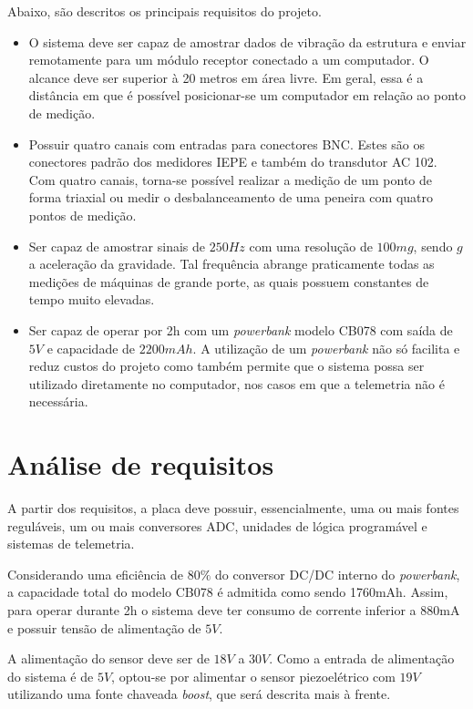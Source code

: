 \documentclass[
	12pt,				%
	openright,			%
	twoside,			%
	a4paper,			%
	english,			%
	french,				%
	spanish,			%
	brazil,				%
	]{abntex2}
\begin{document}
		Abaixo, são descritos os principais requisitos do projeto.

		\begin{itemize}
			\item O sistema deve ser capaz de amostrar dados de vibração da
			estrutura e enviar remotamente para um módulo receptor conectado a um computador. O alcance
			deve ser superior à 20 metros em área livre. Em geral, essa é a distância em que é possível posicionar-se um computador em relação ao ponto de medição.
			
			\item Possuir quatro canais com entradas para conectores BNC. Estes são os conectores padrão dos medidores IEPE e também do transdutor AC 102. Com quatro canais, torna-se possível realizar a medição de um ponto de forma triaxial ou medir o desbalanceamento de uma peneira com quatro pontos de medição.
			
			\item Ser capaz de amostrar sinais de $250Hz$ com uma resolução de $100mg$, sendo $g$
			a aceleração da gravidade. Tal frequência abrange praticamente todas as medições de máquinas de grande porte, as quais possuem constantes de tempo muito elevadas.
			
			\item Ser capaz de operar por 2h com um \textit{powerbank} modelo CB078 com saída de $5V$
			e capacidade de $2200mAh$. A utilização de um \textit{powerbank} não só facilita e reduz custos do projeto como também permite que o sistema possa ser utilizado diretamente no computador, nos casos em que a telemetria não é necessária.
			
		\end{itemize}

	\section{Análise de requisitos}
	
		A partir dos requisitos, a placa deve possuir, essencialmente, uma
		ou mais fontes reguláveis, um ou mais conversores ADC, unidades de lógica programável
		e sistemas de telemetria.

		Considerando uma eficiência de $80\%$ do conversor DC/DC interno do
		\textit{powerbank}, a capacidade total do modelo CB078 é admitida como sendo
		1760mAh. Assim, para operar durante 2h o sistema deve ter consumo de
		corrente inferior a 880mA e possuir tensão de alimentação de $5V$.

		A alimentação do sensor deve ser de $18V$ a $30V$. Como a entrada de
		alimentação do sistema é de $5V$, optou-se por alimentar o sensor
		piezoelétrico com $19V$ utilizando uma fonte chaveada \textit{boost}, que será
		descrita mais à frente.
\end{document}
